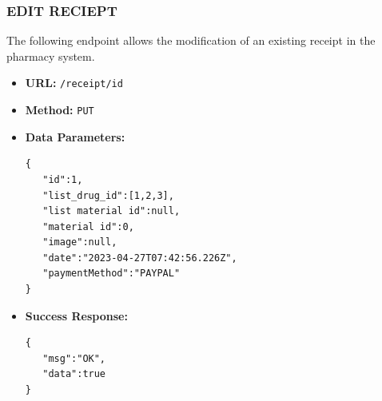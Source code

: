 \subsubsection*{EDIT RECIEPT}
The following endpoint allows the modification of an existing receipt in the pharmacy system.
\begin{itemize}
    \item \textbf{URL:}
    \newline \hspace*{1cm} \texttt{/receipt/{id}}  
    \item \textbf{Method:}
    \newline \hspace*{1cm}\texttt{PUT}
    \item \textbf{Data Parameters:}
\begin{lstlisting}[breaklines]
{
   "id":1,
   "list_drug_id":[1,2,3],
   "list material id":null,
   "material id":0,
   "image":null,
   "date":"2023-04-27T07:42:56.226Z",
   "paymentMethod":"PAYPAL"
}
\end{lstlisting}
    \item \textbf{Success Response:}
\begin{lstlisting}[breaklines]
{
   "msg":"OK",
   "data":true
}
\end{lstlisting}
\end{itemize}

